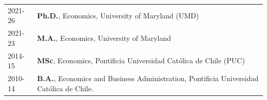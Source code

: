 

\renewcommand{\thefootnote}{\fnsymbol{footnote}}
\setcounter{footnote}{0}

\begin{longtable}[l]{@{}p{} p{}}
    2021-26\footnotemark & \textbf{Ph.D.}, Economics, University of Maryland (UMD)\\

    2021-23 & \textbf{M.A.}, Economics, University of Maryland \\

    2014-15 & \textbf{MSc}, Economics, Pontificia Universidad Católica de Chile (PUC) \\ 
    2010-14 & \textbf{B.A.}, Economics and Business Administration, Pontificia Universidad Católica de Chile.
\end{longtable}



\renewcommand{\thefootnote}{\arabic{footnote}}
\setcounter{footnote}{1}
